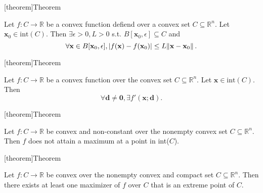 \documentclass[12pt]{report}
\theoremstyle{definition}
\begin{document}
[theorem]{Theorem}
\begin{continuity of convex functions}
    Let $f:C\rightarrow\mathbb{R}$ be a convex function defiend over a convex
    set $C\subseteq\mathbb{R}^{n}$. Let $\mathbf{x}_0\in\text{int}(C)$. Then
    $\exists\epsilon>0,L>0$ s.t. $B[\mathbf{x}_0,\epsilon]\subseteq C$ and
    \[
        \forall \mathbf{x}\in B[\mathbf{x}_0,\epsilon],
        |f(\mathbf{x})-f(\mathbf{x}_0)|\le L\norm{\mathbf{x}-\mathbf{x}_0}.
    \]
\end{continuity of convex functions}

[theorem]{Theorem}
\begin{existence of directional derivative of convex function}
    Let $f:C\rightarrow\mathbb{R}$ be a convex function over the convex set
    $C\subseteq\mathbb{R}^{n}$. Let $\mathbf{x}\in\text{int}(C)$. Then
    \[
        \forall \mathbf{d}\neq\mathbf{0}, \exists f'(\mathbf{x};\mathbf{d}).
    \]
\end{existence of directional derivative of convex function}

[theorem]{Theorem}
\begin{no maximum inside the convex set}
    Let $f:C\rightarrow\mathbb{R}$ be convex and non-constant over the nonempty
    convex set $C\subseteq\mathbb{R}^{n}$. Then $f$ does not attain a maximum at
    a point in int($C$).
\end{no maximum inside the convex set}

[theorem]{Theorem}
\begin{maximum of a convex function over a compact convex set}
    Let $f:C\rightarrow\mathbb{R}$ be convex over the nonempty convex and
    compact set $C\subseteq\mathbb{R}^{n}$. Then there exists at least one
    maximizer of $f$ over $C$ that is an extreme point of $C$.
\end{maximum of a convex function over a compact convex set}
\end{document}

